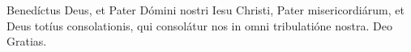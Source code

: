 Benedíctus Deus, et Pater Dómini nostri Iesu Christi, Pater misericordiárum, et Deus totíus consolationis, qui consolátur nos in omni tribulatióne nostra. \rubric{\Rbar}Deo Gratias.